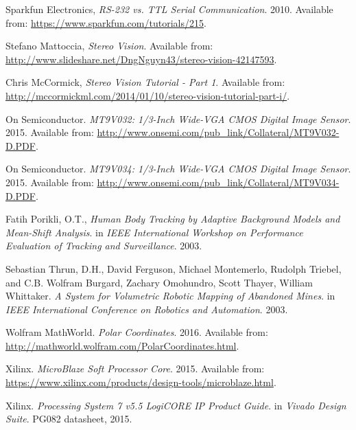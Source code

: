 \begin{thebibliography}{9}
Sparkfun Electronics, \textit{RS-232 vs. TTL Serial Communication}. 2010. Available from: \url{https://www.sparkfun.com/tutorials/215}.

Stefano Mattoccia, \textit{Stereo Vision}. Available from: \url{http://www.slideshare.net/DngNguyn43/stereo-vision-42147593}.

Chris McCormick, \textit{Stereo Vision Tutorial  - Part 1}. Available from: \url{http://mccormickml.com/2014/01/10/stereo-vision-tutorial-part-i/}.

On Semiconductor. 
\textit{MT9V032: 1/3-Inch Wide-VGA CMOS Digital Image Sensor}. 2015. 
Available from: \url{http://www.onsemi.com/pub_link/Collateral/MT9V032-D.PDF}.

On Semiconductor. 
\textit{MT9V034: 1/3-Inch Wide-VGA CMOS Digital Image Sensor}. 2015. 
Available from: \url{http://www.onsemi.com/pub_link/Collateral/MT9V034-D.PDF}.

Fatih Porikli, O.T.,
\textit{Human Body Tracking by Adaptive Background Models and Mean-Shift Analysis}.
in \textit{IEEE International Workshop on Performance Evaluation of Tracking and Surveillance}. 2003.

Sebastian Thrun, D.H., David Ferguson, Michael Montemerlo, Rudolph Triebel, and C.B. Wolfram Burgard, Zachary Omohundro, Scott Thayer, William Whittaker.
\textit{A System for Volumetric Robotic Mapping of Abandoned Mines}. 
in \textit{IEEE International Conference on Robotics and Automation}. 2003.

Wolfram MathWorld. \textit{Polar Coordinates}. 2016. Available from: \url{http://mathworld.wolfram.com/PolarCoordinates.html}.

Xilinx. \textit{MicroBlaze Soft Processor Core}. 2015. Available from: \url{https://www.xilinx.com/products/design-tools/microblaze.html}.

Xilinx. \textit{Processing System 7 v5.5 LogiCORE IP Product Guide}. in \textit{Vivado Design Suite}. PG082 datasheet, 2015.

\end{thebibliography}

